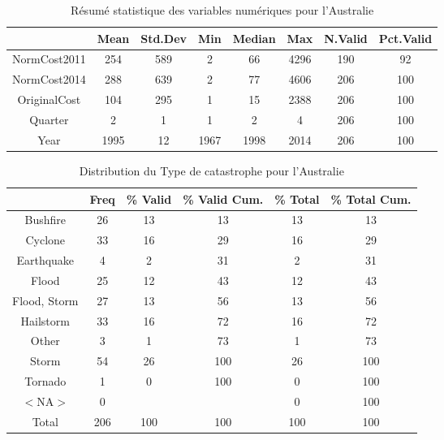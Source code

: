 \begin{table}[ht]
\centering
\begin{tabular}{cccccccc}
  \hline
 & Mean & Std.Dev & Min & Median & Max & N.Valid & Pct.Valid \\ 
  \hline
NormCost2011 & 254 & 589 & 2 & 66 & 4296 & 190 & 92 \\ 
  NormCost2014 & 288 & 639 & 2 & 77 & 4606 & 206 & 100 \\ 
  OriginalCost & 104 & 295 & 1 & 15 & 2388 & 206 & 100 \\ 
  Quarter & 2 & 1 & 1 & 2 & 4 & 206 & 100 \\ 
  Year & 1995 & 12 & 1967 & 1998 & 2014 & 206 & 100 \\ 
   \hline
\end{tabular}
\caption{Résumé statistique des variables numériques pour l'Australie} 
\label{tab:3.1}
\end{table}%
\begin{table}[ht]
\centering
\begin{tabular}{cccccc}
  \hline
 & Freq & \% Valid & \% Valid Cum. & \% Total & \% Total Cum. \\ 
  \hline
Bushfire & 26 & 13 & 13 & 13 & 13 \\ 
  Cyclone & 33 & 16 & 29 & 16 & 29 \\ 
  Earthquake & 4 & 2 & 31 & 2 & 31 \\ 
  Flood & 25 & 12 & 43 & 12 & 43 \\ 
  Flood, Storm & 27 & 13 & 56 & 13 & 56 \\ 
  Hailstorm & 33 & 16 & 72 & 16 & 72 \\ 
  Other & 3 & 1 & 73 & 1 & 73 \\ 
  Storm & 54 & 26 & 100 & 26 & 100 \\ 
  Tornado & 1 & 0 & 100 & 0 & 100 \\ 
  $<$NA$>$ & 0 &  &  & 0 & 100 \\ 
  Total & 206 & 100 & 100 & 100 & 100 \\ 
   \hline
\end{tabular}
\caption{Distribution du Type de catastrophe pour l'Australie} 
\label{tab:3.2}
\end{table}
